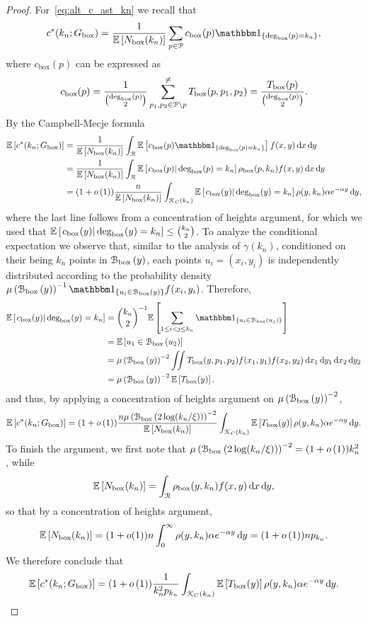 \begin{proof}
For~\eqref{eq:alt_c_ast_kn} we recall that
\[
	c^\ast(k_n; \Gbox) = \frac{1}{\Exp{\Nbox(k_n)}} \sum_{p \in \Pcal} c_{\text{box}}(p)\ind{\Dbox(p) = k_n},
\]
where $c_{\text{box}}(p)$ can be expressed as
\[
	c_{\text{box}}(p) = \frac{1}{\binom{\text{deg}_{\text{box}}(p)}{2}} \sum_{p_1, p_2 \in {\mathcal P} \setminus p}^{\ne} T_{\text{box}}(p,p_1,p_2)
	= \frac{T_{\text{box}}(p)}{\binom{\text{deg}_{\text{box}}(p)}{2}}.
\]
By the Campbell-Mecje formula
\begin{align*}
	\Exp{c^\ast(k_n; \Gbox)} 
	&= \frac{1}{\Exp{\Nbox(k_n)}} \int_{\Rcal} \Exp{c_{\text{box}}(p)\ind{\Dbox(p) = k_n}} f(x,y) \dd x \dd y\\
	&= \frac{1}{\Exp{\Nbox(k_n)}} \int_{\Rcal} \CExp{c_{\text{box}}(p)}{\Dbox(p) = k_n}\rho_{\text{box}}(p,k_n) 
		f(x,y) \dd x \dd y\\
	&= (1+\smallO{1})\frac{n}{\Exp{\Nbox(k_n)}} \int_{\Kcal_C(k_n)} \CExp{c_{\text{box}}(y)}{\Dbox(y) = k_n}
		\rho(y,k_n) \alpha e^{-\alpha y} \dd y,
\end{align*}
where the last line follows from a concentration of heights argument, for which we used that $\mathbb{E}\left[\left.c_{\text{box}}(y)\right|\text{deg}_{\text{box}}(y) = k_n\right] \le \binom{k_n}{2}$. To analyze the conditional expectation we observe that, similar to the analysis of $\gamma(k_n)$, conditioned on their being $k_n$ points in ${\mathcal B}_{\text{box}}\left(y\right)$, each points $u_i = (x_i,y_i)$ is independently distributed according to the probability density $\Mu{\BallPon{y}}^{-1} \ind{u_i \in \BallPon{y}} f(x_i,y_i)$. Therefore,
\begin{align*}
	\CExp{c_{\text{box}}(y)}{\Dbox(y) = k_n}
	&= \binom{k_n}{2}^{-1} \Exp{\sum_{1 \le i < j \le k_n} \ind{u_i \in \BallPon{u_j}}} \\
	&= \Exp{u_1 \in \BallPon{u_2}} \\
	&= \Mu{\BallPon{y}}^{-2} \iint T_{\text{box}}(y,p_1,p_2) f(x_1,y_1) f(x_2,y_2) 
		\dd x_1 \dd y_1 \dd x_2 \dd y_2\\
	&= \Mu{\BallPon{y}}^{-2} \Exp{T_{\text{box}}(y)}.
\end{align*}
and thus, by applying a concentration of heights argument on $\mu\left({\mathcal B}_{\text{box}}\left(y\right)\right)^{-2}$,
\[
	\mathbb{E}\left[c^\ast(k_n; G_{\text{box}})\right] = (1 + o\left(1\right)) \frac{n \mu\left({\mathcal B}_{\text{box}}\left(2\log(k_n/\xi)\right)\right)^{-2}}{\mathbb{E}\left[N_{\text{box}}(k_n)\right]} \int_{{\mathcal K}_C(k_n)} \mathbb{E}\left[T_{\text{box}}(y)\right] \rho(y,k_n) \alpha e^{-\alpha y} \operatorname{\mathrm{d}\hspace{-2pt}} y.
\]
To finish the argument, we first note that $\mu\left({\mathcal B}_{\text{box}}\left(2\log(k_n/\xi)\right)\right)^{-2} = (1+o\left(1\right))k_n^2$, while
\[
	\mathbb{E}\left[N_{\text{box}}(k_n)\right] = \int_{{\mathcal R}} \rho_{\text{box}}(y,k_n) f(x,y) \operatorname{\mathrm{d}\hspace{-2pt}} x \operatorname{\mathrm{d}\hspace{-2pt}} y,
\]
so that by a concentration of heights argument,
\[
	\mathbb{E}\left[N_{\text{box}}(k_n)\right] = (1+o(1)) n \int_{0}^\infty \rho(y,k_n) \alpha e^{-\alpha y} \operatorname{\mathrm{d}\hspace{-2pt}} y 
	= (1+o\left(1\right)) n p_{k_n}.
\]
We therefore conclude that
\[
	\mathbb{E}\left[c^\ast(k_n; G_{\text{box}})\right] = (1 + o\left(1\right)) \frac{1}{k_n^2 p_{k_n}} \int_{{\mathcal K}_C(k_n)} 
		\mathbb{E}\left[T_{\text{box}}(y)\right] \rho(y,k_n) \alpha e^{-\alpha y} \operatorname{\mathrm{d}\hspace{-2pt}} y.
\]



\end{proof}
